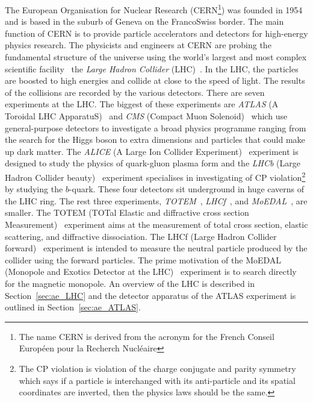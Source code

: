 The European Organisation for Nuclear Research (CERN\footnote{The name CERN is derived from the acronym for the French Conseil Europ\'{e}en pour la Recherch Nucl\'{e}aire}) was founded in 1954 and is based in the suburb of Geneva on the Franco\textendash Swiss border.
The main function of CERN is to provide particle accelerators and detectors for high-energy physics research.
The physicists and engineers at CERN are probing the fundamental structure of the universe using the world's largest and most complex scientific facility \textemdash \ the \textit{Large Hadron Collider} (LHC)~\cite{1748-0221-3-08-S08001}.
In the LHC, the particles are boosted to high energies and collide at close to the speed of light.
The results of the collisions are recorded by the various detectors.
There are seven experiments at the LHC.
The biggest of these experiments are \textit{ATLAS} (A Toroidal LHC ApparatuS)~\cite{1748-0221-3-08-S08003} and \textit{CMS} (Compact Muon Solenoid)~\cite{1748-0221-3-08-S08004} which use general-purpose detectors to investigate a broad physics programme ranging from the search for the Higgs boson to extra dimensions and particles that could make up dark matter.
The \textit{ALICE} (A Large Ion Collider Experiment)~\cite{1748-0221-3-08-S08002} experiment is designed to study the physics of quark-gluon plasma form and the \textit{LHCb} (Large Hadron Collider beauty)~\cite{1748-0221-3-08-S08005} experiment specialises in investigating of CP violation\footnote{The CP violation is violation of the charge conjugate and parity symmetry which says if a particle is interchanged with its anti-particle and its spatial coordinates are inverted, then the physics laws should be the same.} by studying the $b$-quark.
These four detectors sit underground in huge caverns of the LHC ring.
The rest three experiments, \textit{TOTEM}~\cite{1748-0221-3-08-S08007}, \textit{LHCf}~\cite{1748-0221-3-08-S08006}, and \textit{MoEDAL}~\cite{Pinfold:1181486}, are smaller.
The TOTEM (TOTal Elastic and diffractive cross section Measurement)~\cite{1748-0221-3-08-S08007} experiment aims at the measurement of total cross section, elastic scattering, and diffractive dissociation.
The LHCf (Large Hadron Collider forward)~\cite{1748-0221-3-08-S08006} experiment is intended to measure the neutral particle produced by the collider using the forward particles.
The prime motivation of the MoEDAL (Monopole and Exotics Detector at the LHC)~\cite{Pinfold:1181486} experiment is to search directly for the magnetic monopole.
An overview of the LHC is described in Section~\ref{sec:ae_LHC} and the detector apparatus of the ATLAS experiment is outlined in Section~\ref{sec:ae_ATLAS}.

